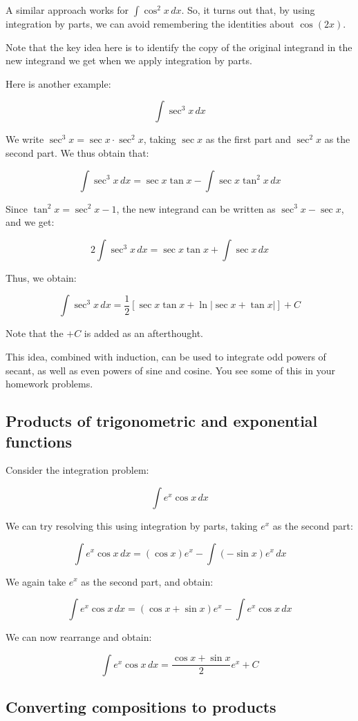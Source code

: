\documentclass{amsart}
\begin{document}
A similar approach works for $\int \cos^2 x \, dx$. So, it turns out
that, by using integration by parts, we can avoid remembering the
identities about $\cos(2x)$.

Note that the key idea here is to identify the copy of the original
integrand in the new integrand we get when we apply integration by
parts.

Here is another example:

$$\int \sec^3 x \, dx$$

We write $\sec^3 x = \sec x \cdot \sec^2 x$, taking $\sec x$ as the
first part and $\sec^2 x$ as the second part. We thus obtain that:

$$\int \sec^3 x \, dx = \sec x \tan x - \int \sec x \tan^2 x \, dx$$

Since $\tan^2 x = \sec^2 x - 1$, the new integrand can be written as
$\sec^3 x - \sec x$, and we get:

$$2 \int \sec^3 x \, dx = \sec x \tan x + \int \sec x \, dx$$

Thus, we obtain:

$$\int \sec^3 x \, dx = \frac{1}{2}[\sec x \tan x + \ln|\sec x + \tan x|] + C$$

Note that the $+C$ is added as an afterthought.

This idea, combined with induction, can be used to integrate odd
powers of secant, as well as even powers of sine and cosine. You see
some of this in your homework problems.

\subsection{Products of trigonometric and exponential functions}

Consider the integration problem:

$$\int e^x \cos x \, dx$$

We can try resolving this using integration by parts, taking $e^x$ as
the second part:

$$\int e^x \cos x \, dx = (\cos x) e^x - \int (-\sin x) e^x \, dx$$

We again take $e^x$ as the second part, and obtain:

$$\int e^x \cos x \, dx = (\cos x + \sin x)e^x - \int e^x \cos x \, dx$$

We can now rearrange and obtain:

$$\int e^x \cos x \, dx = \frac{\cos x + \sin x}{2} e^x + C$$

\subsection{Converting compositions to products}
\end{document}
